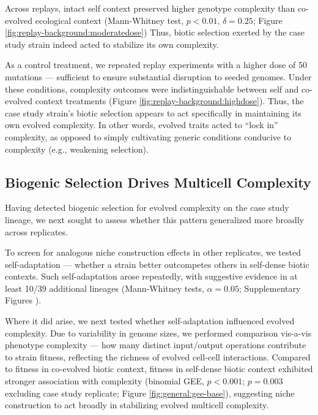 Across replays, intact self context preserved higher genotype complexity than co-evolved ecological context
(Mann-Whitney test, $p < 0.01$, $\delta = 0.25$; Figure \ref{fig:replay-background:moderatedose})
Thus, biotic selection exerted by the case study strain indeed acted to stabilize its own complexity.

As a control treatment, we repeated replay experiments with a higher dose of 50 mutations --- sufficient to ensure substantial disruption to seeded genomes.
Under these conditions, complexity outcomes were indistinguishable between self and co-evolved context treatments (Figure \ref{fig:replay-background:highdose}).
Thus, the case study strain’s biotic selection appears to act specifically in maintaining its own evolved complexity.
In other words, evolved traits acted to ``lock in'' complexity, as opposed to simply cultivating generic conditions conducive to complexity (e.g., weakening selection).


\subsection{Biogenic Selection Drives Multicell Complexity}



Having detected biogenic selection for evolved complexity on the case study lineage, we next sought to assess whether this pattern generalized more broadly across replicates.

To screen for analogous niche construction effects in other replicates, we tested self-adaptation --- whether a strain better outcompetes others in self-dense biotic contexts.
Such self-adaptation arose repeatedly, with suggestive evidence in at least 10/39 additional lineages (Mann-Whitney tests, $\alpha = 0.05$; Supplementary Figures ).

Where it did arise, we next tested whether self-adaptation influenced evolved complexity.
Due to variability in genome sizes, we performed comparison vis-a-vis phenotype complexity --- how many distinct input/output operations contribute to strain fitness, reflecting the richness of evolved cell-cell interactions.
Compared to fitness in co-evolved biotic context, fitness in self-dense biotic context exhibited stronger association with complexity (binomial GEE, $p < 0.001$; $p = 0.003$ excluding case study replicate; Figure \ref{fig:general:gee-base}), suggesting niche construction to act broadly in stabilizing evolved multicell complexity.

